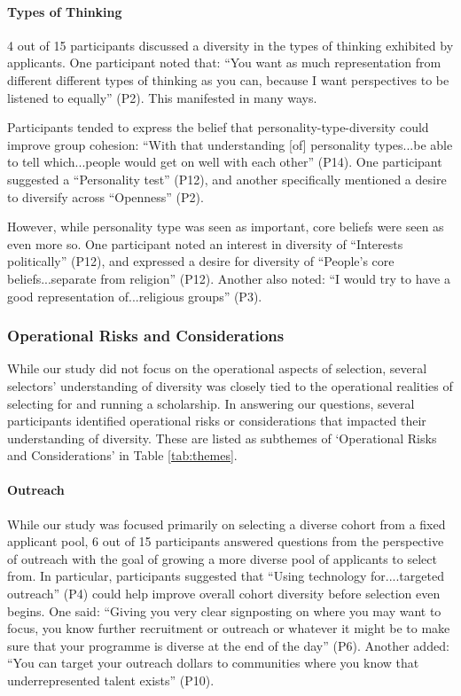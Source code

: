 \paragraph{Types of Thinking}
4 out of 15 participants discussed a diversity in the types of thinking exhibited by applicants. One participant noted that: ``You want as much representation from different different types of thinking as you can, because I want perspectives to be listened to equally'' (P2). This manifested in many ways.

Participants tended to express the belief that personality-type-diversity could improve group cohesion: ``With that understanding [of] personality types...be able to tell which...people would get on well with each other'' (P14). One participant suggested a ``Personality test'' (P12), and another specifically mentioned a desire to diversify across ``Openness'' (P2).

However, while personality type was seen as important, core beliefs were seen as even more so. One participant noted an interest in diversity of ``Interests politically'' (P12), and expressed a desire for diversity of ``People's core beliefs...separate from religion'' (P12). Another also noted: ``I would try to have a good representation of...religious groups'' (P3).

\subsubsection{Operational Risks and Considerations}
While our study did not focus on the operational aspects of selection, several selectors' understanding of diversity was closely tied to the operational realities of selecting for and running a scholarship. In answering our questions, several participants identified operational risks or considerations that impacted their understanding of diversity. These are listed as subthemes of `Operational Risks and Considerations' in Table \ref{tab:themes}.

\paragraph{Outreach}
While our study was focused primarily on selecting a diverse cohort from a fixed applicant pool, 6 out of 15 participants answered questions from the perspective of outreach with the goal of growing a more diverse pool of applicants to select from. In particular, participants suggested that ``Using technology for....targeted outreach'' (P4) could help improve overall cohort diversity before selection even begins. One said: ``Giving you very clear signposting on where you may want to focus, you know further recruitment or outreach or whatever it might be to make sure that your programme is diverse at the end of the day'' (P6). Another added: ``You can target your outreach dollars to communities where you know that underrepresented talent exists'' (P10).

